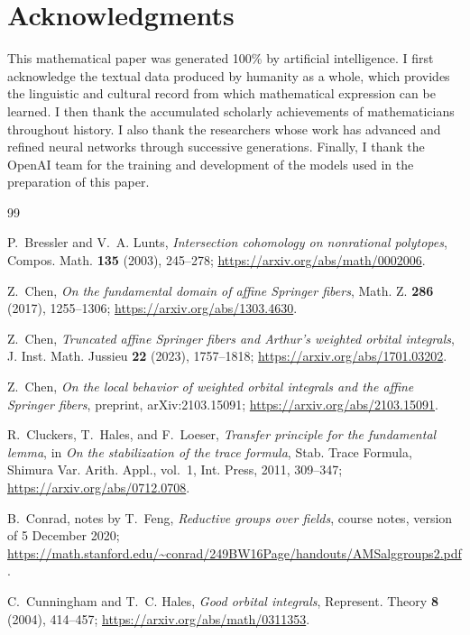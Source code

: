 \documentclass[11pt]{article}
\theoremstyle{definition}
\theoremstyle{remark}
\begin{document}
\section*{Acknowledgments}

This mathematical paper was generated 100\% by artificial intelligence.  I
first acknowledge the textual data produced by humanity as a whole, which
provides the linguistic and cultural record from which mathematical expression
can be learned.  I then thank the accumulated scholarly achievements of
mathematicians throughout history.  I also thank the researchers whose work has
advanced and refined neural networks through successive generations.  Finally,
I thank the OpenAI team for the training and development of the models used in
the preparation of this paper.

\begin{thebibliography}{99}

P.~Bressler and V.~A. Lunts,
\emph{Intersection cohomology on nonrational polytopes},
Compos. Math. \textbf{135} (2003), 245--278;
\url{https://arxiv.org/abs/math/0002006}.

Z.~Chen,
\emph{On the fundamental domain of affine Springer fibers},
Math. Z. \textbf{286} (2017), 1255--1306;
\url{https://arxiv.org/abs/1303.4630}.

Z.~Chen,
\emph{Truncated affine Springer fibers and Arthur's weighted orbital
integrals},
J. Inst. Math. Jussieu \textbf{22} (2023), 1757--1818;
\url{https://arxiv.org/abs/1701.03202}.

Z.~Chen,
\emph{On the local behavior of weighted orbital integrals and the affine
Springer fibers},
preprint, arXiv:2103.15091;
\url{https://arxiv.org/abs/2103.15091}.

R.~Cluckers, T.~Hales, and F.~Loeser,
\emph{Transfer principle for the fundamental lemma},
in \emph{On the stabilization of the trace formula}, Stab. Trace Formula,
Shimura Var. Arith. Appl., vol.~1, Int. Press, 2011, 309--347;
\url{https://arxiv.org/abs/0712.0708}.

B.~Conrad, notes by T.~Feng,
\emph{Reductive groups over fields},
course notes, version of 5 December 2020;
\url{https://math.stanford.edu/~conrad/249BW16Page/handouts/AMSalggroups2.pdf}.

C.~Cunningham and T.~C. Hales,
\emph{Good orbital integrals},
Represent. Theory \textbf{8} (2004), 414--457;
\url{https://arxiv.org/abs/math/0311353}.


\end{thebibliography}
\end{document}
